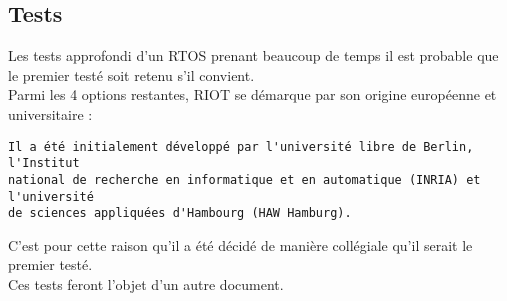 \subsection{Tests}
Les tests approfondi d'un RTOS prenant beaucoup de temps il est probable que le
premier testé soit retenu s'il convient.\\

Parmi les 4 options restantes, RIOT se démarque par son origine européenne et
universitaire \cite{ref11} :
\begin{verbatim}
Il a été initialement développé par l'université libre de Berlin, l'Institut
national de recherche en informatique et en automatique (INRIA) et l'université
de sciences appliquées d'Hambourg (HAW Hamburg).
\end{verbatim} 

C'est pour cette raison qu'il a été décidé de manière collégiale qu'il serait le
premier testé.\\

Ces tests feront l'objet d'un autre document.
